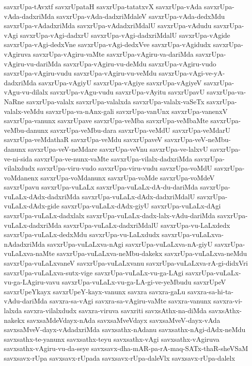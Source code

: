 {savxrUpa-tAvxtf
savxrUpataH
savxrUpa-tatatxvX
savxrUpa-vAda
savxrUpa-vAda-dadxriMda
savxrUpa-vAda-dadxriMdaleV
savxrUpa-vAda-dedxMdu
savxrUpa-vAdadxriMda
savxrUpa-vAdadxriMdalU
savxrUpa-vAdudu
savxrUpa-vAgi
savxrUpa-vAgi-dadxrU
savxrUpa-vAgi-dadxriMdalU
savxrUpa-vAgide
savxrUpa-vAgi-dedxVne
savxrUpa-vAgi-dedxVve
savxrUpa-vAgidudx
savxrUpa-vAgiruva
savxrUpa-vAgiru-vaMte
savxrUpa-vAgiru-va-dariMda
savxrUpa-vAgiru-vu-dariMda
savxrUpa-vAgiru-vu-deMdu
savxrUpa-vAgiru-vudo
savxrUpa-vAgiru-vudu
savxrUpa-vAgiru-vu-veMdu
savxrUpa-vAgi-ve-yA-dadxriMda
savxrUpa-vAgiyU
savxrUpa-vAgiye
savxrUpa-vAgiyeV
savxrUpa-vAgu-vu-dilalx
savxrUpa-vAgu-vudu
savxrUpa-vAyitu
savxrUpavU
savxrUpa-va-NaRne
savxrUpa-valalx
savxrUpa-valalxda
savxrUpa-valalx-vaSeTx
savxrUpa-valalx-veMdu
savxrUpa-va-nAnx-gali
savxrUpa-vanUnx
savxrUpa-vanenxV
savxrUpa-vanunx
savxrUpave
savxrUpa-veMba
savxrUpa-veMbaMte
savxrUpa-veMbu-danunx
savxrUpa-veMbu-dara
savxrUpa-veMdU
savxrUpa-veMdarU
savxrUpa-veMdathaR
savxrUpa-veMdu
savxrUpaveV
savxrUpa-veV-neMbu-danunx
savxrUpa-veV-neMdare
savxrUpa-veVnu
savxrUpa-ve-lalxvU
savxrUpa-ve-ni-sida
savxrUpa-ve-nunx-vaMte
savxrUpa-vilalx-dadxriMda
savxrUpa-vilalxdudx
savxrUpa-viru-vudo
savxrUpa-viru-vudu
savxrUpa-voMdU
savxrUpa-voMdanenx
savxrUpa-voMdanunx
savxrUpa-voMde
savxrUpa-voMdeV
savxrUpavu
savxrUpa-vuLaLx
savxrUpa-vuLaLx-dA-du-dariMda
savxrUpa-vuLaLx-dAdx-dadxriMda
savxrUpa-vuLaLx-dAdx-dadxriMdalU
savxrUpa-vuLaLx-dAdx-gide
savxrUpa-vuLaLx-dAdx-giyU
savxrUpa-vuLaLx-dAgi
savxrUpa-vuLaLx-dadxlalx
savxrUpa-vuLaLx-dadx-lalx-vAdu-dariMda
savxrUpa-vuLaLx-dadxriMda
savxrUpa-vuLaLx-dadxriMdalU
savxrUpa-vu-LaLxdedx
savxrUpa-vuLaLx-dedxMdu
savxrUpa-vu-LaLxdudx
savxrUpa-vuLaLxva-nAdadxriMda
savxrUpa-vuLaLxva-nAgi
savxrUpa-vuLaLxva-nA-giyU
savxrUpa-vuLaLxva-naMte
savxrUpa-vuLaLxva-neMbu-dakekx
savxrUpa-vuLaLxva-neMdu
savxrUpa-vuLaLxvaneV
savxrUpa-vuLaLxvanu
savxrUpa-vuLaLxva-rA-gi-didxVri
savxrUpa-vuLaLxva-sutx-vige
savxrUpa-vuLaLx-vu-ga-LAgi
savxrUpa-vuLaLx-vu-ga-LAgiru-vavu
savxrUpa-vuLaLx-vu-ga-LA-gi-ve-yeMbudu
savxrUpeV
savxrUpeYkayx
savxrUpeY-kayx-vanunx
savxra
savxra-gaLu
savxra-sa-hi-ta-vAdu-dariMda
savxra-sa-vAgi
savxra-sa-vAgiru-vaMte
savxra-vanunx
savxra-vi-lalxda
savxra-vilalxdudx
savxra-viruva
savxriti
savxsAthx-na-diMda
savxsAthx-nakekx
savxsaMdeVdayx-nAda
savxsaMveVdayx
savxsaMveV-dayx-vAda
savxsaMveV-dayx-vAdadxriMda
savxsathx-nAdanu
savxsathx-nAgi-dAdx-neMdu
savxsathx-te-yanunx
savxsathx-teyu
savxsathx-vAgi
savxsathx-vAgiruva
savxsathx-vAgiru-vu-da-seye
savxsavx-dha-mAR-pa-rA-maq-SATx-thaR-sheVSaM
savxsavx-rUpa
savxsavx-rUpada
savxsavx-rUpa-daleVlx
savxsavx-rUpa-dalelx
}
